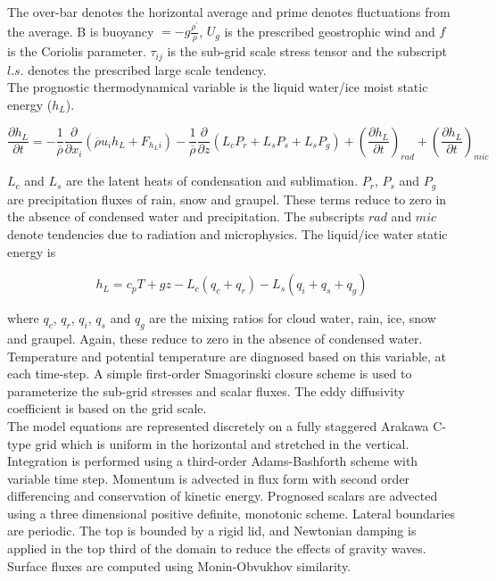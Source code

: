 The over-bar denotes the horizontal average and prime denotes fluctuations from the average. B is buoyancy $=-g\frac{\rho^{'}}{\rho}$,  $U_{g}$ is the prescribed geostrophic wind and $f$ is the Coriolis parameter.  $\tau_{ij}$ is the sub-grid scale stress tensor and the subscript $l.s.$ denotes the prescribed large scale tendency.\\      

The prognostic thermodynamical variable is the liquid water/ice moist static energy ($h_{L}$). 

\begin{equation}
\frac{\partial h_{L}}{\partial t} = -\frac{1}{\overline{\rho}}\frac{\partial}{\partial x_{i}}(\overline{\rho} u_{i}h_{L} + F_{h_{L}i}) - \frac{1}{\overline{\rho}}\frac{\partial}{\partial z}(L_{c}P_{r} + L_{s}P_{s} + L_{s}P_{g}) + \left( \frac{\partial h_{L}}{\partial t} \right)_{rad} + \left( \frac{\partial h_{L}}{\partial t} \right)_{mic}
\end{equation}

$L_{c}$ and $L_{s}$ are the latent heats of condensation and sublimation.  $P_{r}$, $P_{s}$ and $P_{g}$ are precipitation fluxes of rain, snow and graupel.  These terms reduce to zero in the absence of condensed water and precipitation.  The subscripts $rad$ and $mic$ denote tendencies due to radiation and microphysics.  The liquid/ice water static energy is

\begin{equation}
h_{L} = c_{p}T + gz - L_{c}(q_{c} + q_{r}) - L_{s}(q_{i} + q_{s} + q_{g}) 
\end{equation}

where $q_{c}$, $q_{r}$, $q_{i}$, $q_{s}$ and $q_{g}$ are the mixing ratios for cloud water, rain, ice, snow and graupel.  Again, these reduce to zero in the absence of condensed water.  Temperature and potential temperature are diagnosed based on this variable, at each time-step.  A simple first-order Smagorinski closure scheme is used to parameterize the sub-grid stresses and scalar fluxes. The eddy diffusivity coefficient is based on the grid scale.\\

The model equations are represented discretely on a fully staggered Arakawa C-type grid which is uniform in the horizontal and stretched in the vertical. Integration is performed using a third-order Adams-Bashforth scheme with variable time step.  Momentum is advected in flux form with second order differencing and conservation of kinetic energy. 
Prognosed scalars are advected using a three dimensional positive definite, monotonic scheme.  Lateral boundaries are periodic.  The top is bounded by a rigid lid, and
Newtonian damping is applied in the top third of the domain to reduce the effects of gravity waves.  Surface fluxes are computed using Monin-Obvukhov similarity.\\

